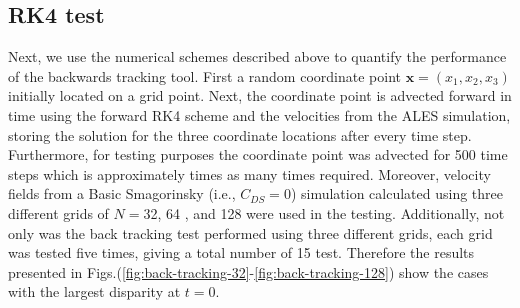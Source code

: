 \subsection{RK4 test}
Next, we use the numerical schemes described above to quantify the
performance of the backwards tracking tool. First a random coordinate point
$\mathbf{x}=(x_{1}, x_{2}, x_{3})$ initially located on a grid point. Next,
the coordinate point is advected forward in time using the forward RK4
scheme and the velocities from the ALES simulation, storing the solution
for the three coordinate locations after every time step. Furthermore, for
testing purposes the coordinate point was advected for 500 time steps which
is approximately times as many times required. Moreover, velocity fields
from a Basic Smagorinsky (i.e., $C_{DS} =0$) simulation calculated using
three different grids of $N=$32, 64 , and 128 were used in the testing.
Additionally, not only was the back tracking test performed using three
different grids, each grid was tested five times, giving a total number of
15 test. Therefore the results presented in
Figs.(\ref{fig:back-tracking-32}-\ref{fig:back-tracking-128}) show the
cases with the largest disparity at $t=0$.  



